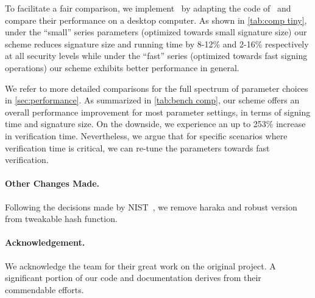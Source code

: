 To facilitate a fair comparison, we implement \SPHINCSA\ by adapting the code of \SPHINCSP\ and compare their performance on a desktop computer. As shown in \cref{tab:comp tiny}, under the ``small'' series parameters (optimized towards small signature size) our scheme reduces signature size and running time by 8-12\% and 2-16\% respectively at all security levels while under the ``fast'' series (optimized towards fast signing operations) our scheme exhibits better performance in general. 

We refer to more detailed comparisons for the full spectrum of parameter choices in \cref{sec:performance}.
As summarized in \cref{tab:bench comp}, our scheme offers an overall performance improvement for most parameter settings, in terms of signing time and signature size. On the downside, we experience an up to 253\% increase in verification time. Nevertheless, we argue that for specific scenarios where verification time is critical, we can re-tune the parameters towards fast verification. 

\paragraph{Other Changes Made.}
Following the decisions made by NIST~\cite{nistdecision}, we remove haraka and robust version from tweakable hash function.

\paragraph{Acknowledgement.}

We acknowledge the \SPHINCSP team for their great work on the original \SPHINCSP project.  A significant portion of our code and documentation derives from their commendable efforts.